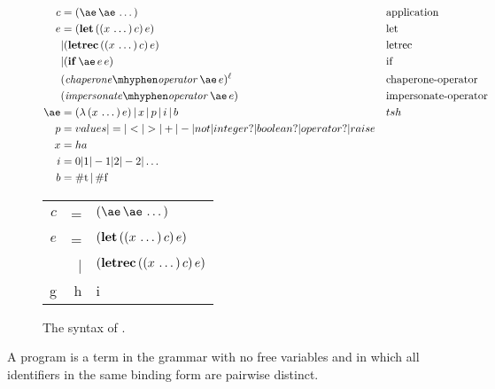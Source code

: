 \documentclass{sigplanconf}
\begin{document}
\newcommand{\true}[0]{\mathrm{\#t}}
\newcommand{\false}[0]{\mathrm{\#f}}
\setlength{\tabcolsep}{1pt}
\begin{figure}
\label{fig:syntax}

\begin{align*}
c &= \appe{\ae}{\ae\,\dots} && \text{application}\\
e &= \lete{x\,\dots}{c}{e} && \text{let}\\
  &|  \letrece{x\,\dots}{c}{e} && \text{letrec}\\
  &|  \ife{\ae}{e}{e} && \text{if}\\
  &   \chae{\ae}{e} && \text{chaperone-operator}\\
  &   \impe{\ae}{e} && \text{impersonate-operator}\\
\ae &= \lame{x\,\dots}{e}\,|\,x\,|\,p\,|\,i\,|\,b && tsh\\
p &= values | = | < | > | + | - | not | integer? | boolean? | operator? | raise && \\
x &= ha & \\
i &= 0|1|-1|2|-2|\dots\\
b &= \true\,|\,\false\\
\end{align*}

\begin{tabular}{rrl}
$c$ & = & $\appe{\ae}{\ae\,\dots}$\\
$e$ & = & $(\mathbf{let}\,((x\,\dots)\,c)\,e)$\\
    & | & $(\mathbf{letrec}\,((x\,\dots)\,c)\,e)$\\
g & h & i
\end{tabular}
\caption{The syntax of \chapcalc.}
\end{figure}

A program is a term in the grammar with no free variables and in which all identifiers in the same binding form are pairwise distinct.





\end{document}
